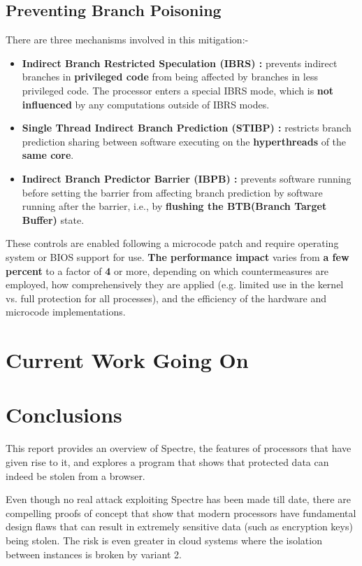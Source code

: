 \documentclass[12pt]{article}
\begin{document}
\subsection{Preventing Branch Poisoning}
There are three mechanisms involved in this mitigation:- 
\begin{itemize}
	\item \textbf{Indirect Branch Restricted Speculation (IBRS) : } prevents indirect branches in \textbf{privileged code} from being affected by branches in less privileged code. The processor enters a special IBRS mode, which is \textbf{not influenced} by any computations outside of IBRS modes.
	\item \textbf{Single Thread Indirect Branch Prediction (STIBP) : } restricts branch prediction sharing between software executing on the \textbf{hyperthreads} of the \textbf{same core}.
	\item \textbf{Indirect Branch Predictor Barrier (IBPB) : } prevents software running before setting the barrier from affecting branch prediction by software running after the barrier, i.e., by \textbf{flushing the BTB(Branch Target Buffer)} state.
\end{itemize}
These controls are enabled following a microcode patch and require operating system or BIOS support for use. \textbf{The performance impact} varies from \textbf{a few percent} to a factor of \textbf{4} or more, depending on which countermeasures are employed, how comprehensively they are applied (e.g. limited use in the kernel vs. full protection for all processes), and the efficiency of the hardware and microcode implementations.
\section{Current Work Going On}
\section{Conclusions}
This report provides an overview of Spectre, the features of processors that have given rise to it, and explores a program that shows that protected data can indeed be stolen from a browser. 

Even though no real attack exploiting Spectre has been made till date, there are compelling proofs of concept that show that modern processors have fundamental design flaws that can result in extremely sensitive data (such as encryption keys) being stolen. The risk is even greater in cloud systems where the isolation between instances is broken by variant 2. 
\end{document}
